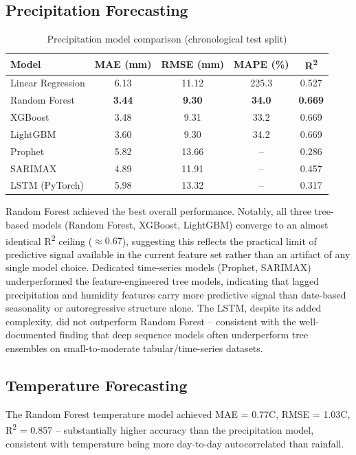 \documentclass[11pt]{article}
\begin{document}
\subsection{Precipitation Forecasting}

\begin{table}[h]
\centering
\caption{Precipitation model comparison (chronological test split)}
\begin{tabular}{lcccc}
\toprule
Model & MAE (mm) & RMSE (mm) & MAPE (\%) & R\textsuperscript{2} \\
\midrule
Linear Regression & 6.13 & 11.12 & 225.3 & 0.527 \\
Random Forest      & \textbf{3.44} & \textbf{9.30}  & \textbf{34.0}  & \textbf{0.669} \\
XGBoost            & 3.48 & 9.31  & 33.2  & 0.669 \\
LightGBM           & 3.60 & 9.30  & 34.2  & 0.669 \\
Prophet            & 5.82 & 13.66 & --    & 0.286 \\
SARIMAX            & 4.89 & 11.91 & --    & 0.457 \\
LSTM (PyTorch)     & 5.98 & 13.32 & --    & 0.317 \\
\bottomrule
\end{tabular}
\end{table}

Random Forest achieved the best overall performance. Notably, all three tree-based models (Random Forest, XGBoost, LightGBM) converge to an almost identical R\textsuperscript{2} ceiling ($\approx 0.67$), suggesting this reflects the practical limit of predictive signal available in the current feature set rather than an artifact of any single model choice. Dedicated time-series models (Prophet, SARIMAX) underperformed the feature-engineered tree models, indicating that lagged precipitation and humidity features carry more predictive signal than date-based seasonality or autoregressive structure alone. The LSTM, despite its added complexity, did not outperform Random Forest -- consistent with the well-documented finding that deep sequence models often underperform tree ensembles on small-to-moderate tabular/time-series datasets.

\subsection{Temperature Forecasting}
The Random Forest temperature model achieved MAE = 0.77\textdegree{}C, RMSE = 1.03\textdegree{}C, R\textsuperscript{2} = 0.857 -- substantially higher accuracy than the precipitation model, consistent with temperature being more day-to-day autocorrelated than rainfall.
\end{document}
